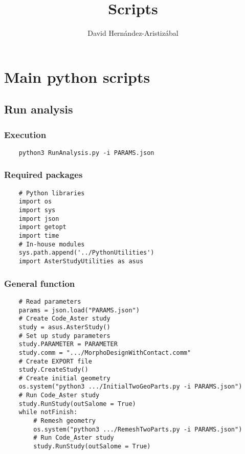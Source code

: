 \documentclass{article}
\title{Scripts}
\author{David Hernández-Aristizábal}
\begin{document}
\hypersetup{linkcolor = BlueHTML}

\maketitle
\tableofcontents

\section{Main python scripts}
\subsection{Run analysis}
\subsubsection{Execution}
\begin{verbatim}
    python3 RunAnalysis.py -i PARAMS.json
\end{verbatim}
\subsubsection{Required packages}
\begin{verbatim}
    # Python libraries
    import os
    import sys
    import json
    import getopt
    import time
    # In-house modules
    sys.path.append('../PythonUtilities')
    import AsterStudyUtilities as asus
\end{verbatim}
\subsubsection{General function}
\begin{verbatim}
    # Read parameters
    params = json.load("PARAMS.json")
    # Create Code_Aster study
    study = asus.AsterStudy()
    # Set up study parameters
    study.PARAMETER = PARAMETER
    study.comm = ".../MorphoDesignWithContact.comm"
    # Create EXPORT file
    study.CreateStudy()
    # Create initial geometry
    os.system("python3 .../InitialTwoGeoParts.py -i PARAMS.json")
    # Run Code_Aster study
    study.RunStudy(outSalome = True)
    while notFinish:
        # Remesh geometry
        os.system("python3 .../RemeshTwoParts.py -i PARAMS.json")
        # Run Code_Aster study
        study.RunStudy(outSalome = True)

\end{verbatim}
\end{document}

